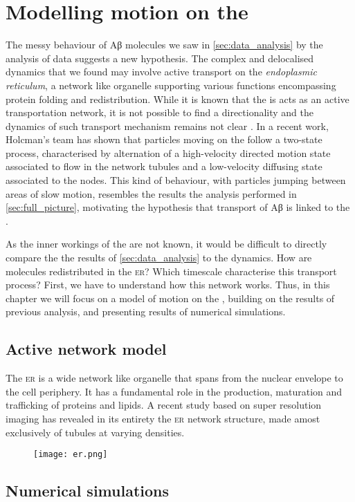 
\chapter{Modelling motion on the }\label{sec:modelling}

The messy behaviour of Aβ molecules we saw in \cref{sec:data_analysis} by the analysis of  data suggests a new hypothesis. The complex and delocalised dynamics that we found may involve active transport on the \emph{endoplasmic reticulum}, a network like organelle supporting various functions encompassing protein folding and redistribution. While it is known that the  is acts as an active transportation network, it is not possible to find a directionality and the dynamics of such transport mechanism remains not clear .
In a recent work, Holcman's team has shown that particles moving on the  follow a two-state process, characterised by alternation of a high-velocity directed motion state associated to flow in the network tubules and a low-velocity diffusing state associated to the nodes. This kind of behaviour, with particles jumping between areas of slow motion, resembles the results the analysis performed in \cref{sec:full_picture}, motivating the hypothesis that transport of Aβ is linked to the .

As the inner workings of the  are not known, it would be difficult to directly compare the the results of \cref{sec:data_analysis} to the  dynamics. How are molecules redistributed in the \textsc{er}? Which timescale characterise this transport process? First, we have to understand how this network works. Thus, in this chapter we will focus on a model of motion on the , building on the results of previous analysis,  and presenting results of numerical simulations.



\section{Active network model}

The \textsc{er} is a wide network like organelle that  spans from the nuclear envelope to the cell periphery. It has a fundamental role in the production, maturation and trafficking of proteins and lipids. A recent study based on super resolution imaging \cite{ls_er} has revealed in its entirety the \textsc{er} network structure, made amost exclusively of tubules at varying densities.

\begin{figure}
  \label{fig:er}
  \texttt{[image: er.png]}
\end{figure}


\section{Numerical simulations}
